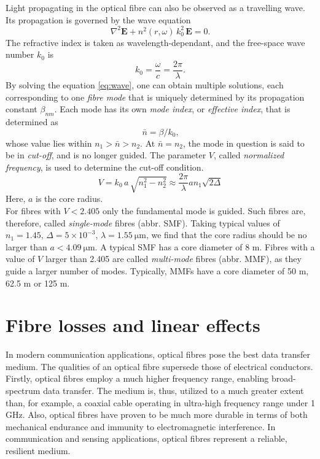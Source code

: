 \documentclass{standalone}
\begin{document}
Light propagating in the optical fibre can also be observed as a travelling wave. Its propagation is governed by the wave equation
\begin{equation} \label{eq:wave}
\nabla^2 \mathbf{E} + n^2(r,\omega) \, k_0^2 \, \mathbf{E} = 0 \textrm{.}
\end{equation}
The refractive index is taken as wavelength-dependant, and the free-space wave number $k_0$ is
\begin{equation}
k_0 = \frac{\omega}{c} = \frac{2 \pi}{\lambda} \textrm{.}
\end{equation}
By solving the equation \ref{eq:wave}, one can obtain multiple solutions, each corresponding to one \textit{fibre mode} that is uniquely determined by its propagation constant $\beta_{nm}$. Each mode has its own \textit{mode index}, or \textit{effective index}, that is determined as
\begin{equation}
\bar{n} = \beta/k_0 \textrm{,}
\end{equation}
whose value lies within $n_1 > \bar{n} > n_2$. At $\bar{n} = n_2$, the mode in question is said to be in \textit{cut-off}, and is no longer guided. The parameter $V$, called \textit{normalized frequency}, is used to determine the cut-off condition.
\begin{equation}
V = k_0 \, a \, \sqrt{n_1^2 - n_2^2} \approx \frac{2 \pi}{\lambda} a n_1 \sqrt{2 \varDelta}
\end{equation}
Here, $a$ is the core radius. \\

For fibres with $V < 2.405$ only the fundamental mode is guided. Such fibres are, therefore, called \textit{single-mode} fibres (abbr. SMF). Taking typical values of $n_1 = 1.45$, $\varDelta = 5 \times 10^{-3}$, $\lambda = \SI{1.55}{\micro \meter}$, we find that the core radius should be no larger than $a < \SI{4.09}{\micro \meter}$. A typical SMF has a core diameter of 8 \textmu m. Fibres with a value of $V$ larger than 2.405 are called \textit{multi-mode} fibres (abbr. MMF), as they guide a larger number of modes. Typically, MMFs have a core diameter of 50 \textmu m, 62.5 \textmu m or 125 \textmu m.


\section{Fibre losses and linear effects}

In modern communication applications, optical fibres pose the best data transfer medium. The qualities of an optical fibre supersede those of electrical conductors. Firstly, optical fibres employ a much higher frequency range, enabling broad-spectrum data transfer. The medium is, thus, utilized to a much greater extent than, for example, a coaxial cable operating in ultra-high frequency range under 1 GHz. Also, optical fibres have proven to be much more durable in terms of both mechanical endurance and immunity to electromagnetic interference. In communication and sensing applications, optical fibres represent a reliable, resilient medium. \\
\end{document}
